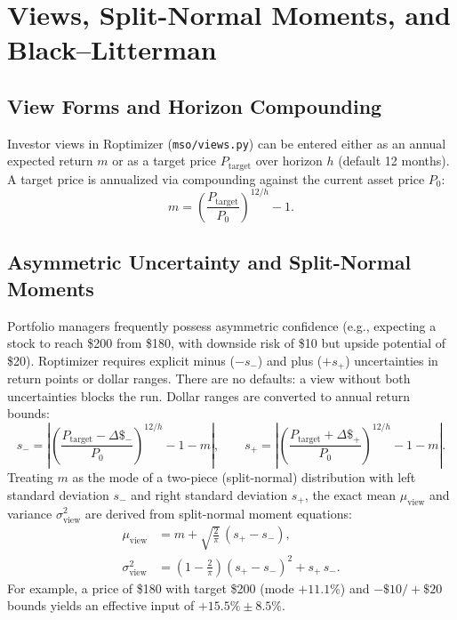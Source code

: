 \documentclass[11pt]{article}
\begin{document}
\section{Views, Split-Normal Moments, and Black--Litterman}
\subsection{View Forms and Horizon Compounding}
Investor views in Roptimizer (\texttt{mso/views.py}) can be entered either as an annual expected return $m$
or as a target price $P_{\mathrm{target}}$ over horizon $h$ (default 12 months). A target price is annualized
via compounding against the current asset price $P_0$:
\begin{equation}
m = \left(\frac{P_{\mathrm{target}}}{P_0}\right)^{12/h} - 1.
\end{equation}

\subsection{Asymmetric Uncertainty and Split-Normal Moments}
Portfolio managers frequently possess asymmetric confidence (e.g., expecting a stock to reach \$200 from \$180,
with downside risk of \$10 but upside potential of \$20). Roptimizer requires explicit minus ($-s_-$) and
plus ($+s_+$) uncertainties in return points or dollar ranges. There are no defaults: a view without both
uncertainties blocks the run.
Dollar ranges are converted to annual return bounds:
\begin{equation}
s_- = \left|\left(\frac{P_{\mathrm{target}} - \Delta \$_-}{P_0}\right)^{12/h} - 1 - m\right|, \qquad
s_+ = \left|\left(\frac{P_{\mathrm{target}} + \Delta \$_+}{P_0}\right)^{12/h} - 1 - m\right|.
\end{equation}
Treating $m$ as the mode of a two-piece (split-normal) distribution with left standard deviation $s_-$
and right standard deviation $s_+$, the exact mean $\mu_{\mathrm{view}}$ and variance $\sigma_{\mathrm{view}}^2$
are derived from split-normal moment equations:
\begin{align}
\mu_{\mathrm{view}} &= m + \sqrt{\frac{2}{\pi}}\,(s_+ - s_-), \\
\sigma_{\mathrm{view}}^2 &= \left(1 - \frac{2}{\pi}\right)(s_+ - s_-)^2 + s_+\,s_-.
\end{align}
For example, a price of \$180 with target \$200 (mode $+11.1\%$) and $-\$10 / +\$20$ bounds yields an effective
input of $+15.5\% \pm 8.5\%$.
\end{document}
